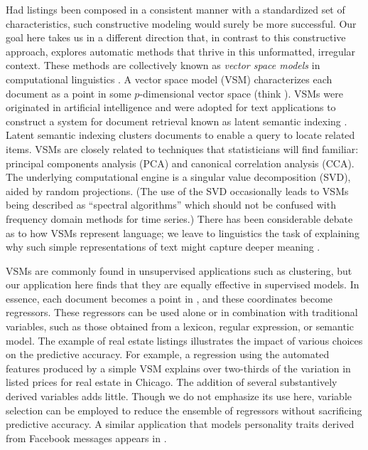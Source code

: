 \documentclass[10pt]{article}
\begin{document}
 Had listings been composed in a consistent manner with a standardized set of
 characteristics, such constructive modeling would surely be more successful.
  Our goal here takes us in a different direction that, in contrast to this
 constructive approach, explores automatic methods that thrive in this
 unformatted, irregular context.  These methods are collectively known as {\em
 vector space models} in computational linguistics \citep[e.g.][]{turney10}.  A
 vector space model (VSM) characterizes each document as a point in some
 $p$-dimensional vector space (think \Rp).  VSMs were originated in artificial
 intelligence and were adopted for text applications to construct a system for
 document retrieval known as latent semantic indexing \citep{deerwester88}.
  Latent semantic indexing clusters documents to enable a query to locate
 related items.  VSMs are closely related to techniques that statisticians will
 find familiar: principal components analysis (PCA) and canonical correlation
 analysis (CCA).  The underlying computational engine is a singular value
 decomposition (SVD), aided by random projections.  (The use of the SVD
 occasionally leads to VSMs being described as ``spectral algorithms'' which
 should not be confused with frequency domain methods for time series.)  There
 has been considerable debate as to how VSMs represent language; we leave to
 linguistics the task of explaining why such simple representations of text
 might capture deeper meaning \citep{deerwester90, landauer97, bullinaria07,
 turney10}.


 VSMs are commonly found in unsupervised applications such as clustering, but
 our application here finds that they are equally effective in supervised
 models.  In essence, each document becomes a point in \Rp, and these
 coordinates become regressors.  These regressors can be used alone or in
 combination with traditional variables, such as those obtained from a lexicon,
 regular expression, or semantic model.  The example of real estate listings
 illustrates the impact of various choices on the predictive accuracy.  For
 example, a regression using the automated features produced by a simple VSM
 explains over two-thirds of the variation in listed prices for real estate in
 Chicago.  The addition of several substantively derived variables adds little.
  Though we do not emphasize its use here, variable selection can be employed to
 reduce the ensemble of regressors without sacrificing predictive accuracy.  A
 similar application that models personality traits derived from Facebook
 messages appears in \citet{ungar13}.
\end{document}
